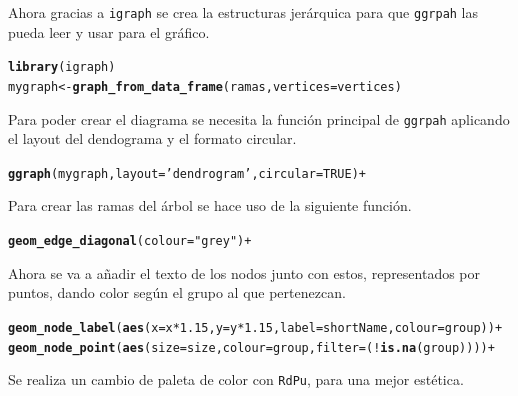 \documentclass{article}\usepackage[]{graphicx}\usepackage[]{color}
\makeatletter
\newcommand{\hlstr}[1]{\textcolor[rgb]{0.192,0.494,0.8}{#1}}%
\newcommand{\hlstd}[1]{\textcolor[rgb]{0.345,0.345,0.345}{#1}}%
\newcommand{\hlkwb}[1]{\textcolor[rgb]{0.69,0.353,0.396}{#1}}%
\newcommand{\hlkwc}[1]{\textcolor[rgb]{0.333,0.667,0.333}{#1}}%
\newcommand{\hlkwd}[1]{\textcolor[rgb]{0.737,0.353,0.396}{\textbf{#1}}}%
\newenvironment{kframe}{%
 \def\at@end@of@kframe{}%
 \ifinner\ifhmode%
  \def\at@end@of@kframe{\end{minipage}}%
  \begin{minipage}{\columnwidth}%
 \fi\fi%
 \def\FrameCommand##1{\hskip\@totalleftmargin \hskip-\fboxsep
 \colorbox{shadecolor}{##1}\hskip-\fboxsep
     \hskip-\linewidth \hskip-\@totalleftmargin \hskip\columnwidth}%
 \MakeFramed {\advance\hsize-\width
   \@totalleftmargin\z@ \linewidth\hsize
   \@setminipage}}%
 {\par\unskip\endMakeFramed%
 \at@end@of@kframe}
\newenvironment{knitrout}{}{} %
\makeatother
\begin{document}
\clearpage
Ahora gracias a \texttt{igraph} se crea la estructuras jer\'arquica para que \texttt{ggrpah} las pueda leer y usar para el gr\'afico.
\begin{knitrout}
\color{fgcolor}\begin{kframe}
\begin{alltt}
\hlkwd{library}\hlstd{(igraph)}
\hlstd{mygraph} \hlkwb{<-} \hlkwd{graph_from_data_frame}\hlstd{( ramas,} \hlkwc{vertices}\hlstd{=vertices)}
\end{alltt}
\end{kframe}
\end{knitrout}
Para poder crear el diagrama se necesita la funci\'on principal de \texttt{ggrpah} aplicando el layout del dendograma y el formato circular.

\begin{knitrout}
\color{fgcolor}\begin{kframe}
\begin{alltt}
\hlkwd{ggraph}(mygraph, layout = \hlstr{'dendrogram'}, circular = TRUE) + 
\end{alltt}
\end{kframe}
\end{knitrout}
Para crear las ramas del \'arbol se hace uso de la siguiente funci\'on.
\begin{knitrout}
\color{fgcolor}\begin{kframe}
\begin{alltt}
  \hlkwd{geom_edge_diagonal}(colour=\hlstr{"grey"}) +
\end{alltt}
\end{kframe}
\end{knitrout}
Ahora se va a a\~nadir el texto de los nodos junto con estos, representados por puntos, dando color seg\'un el grupo al que pertenezcan.
\begin{knitrout}
\color{fgcolor}\begin{kframe}
\begin{alltt}
  \hlkwd{geom_node_label}(\hlkwd{aes}(x = x*1.15, y=y*1.15, label = shortName, colour=group)) +
  \hlkwd{geom_node_point}(\hlkwd{aes}(size = size, colour=group, filter = (!\hlkwd{is.na}(group)))) +
\end{alltt}
\end{kframe}
\end{knitrout}
Se realiza un cambio de paleta de color con \texttt{RdPu}, para una mejor est\'etica.
\end{document}
